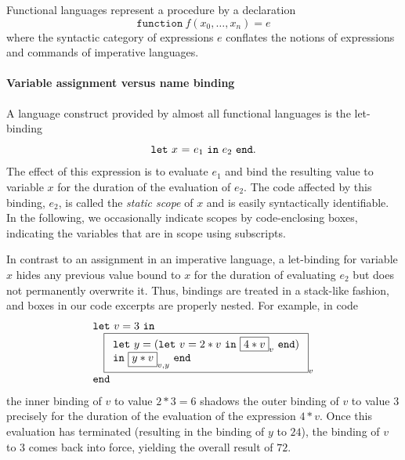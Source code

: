 Functional languages represent a procedure by a declaration
$$\mathtt{function}\ f(x_0, \ldots, x_n) = e$$ where the syntactic
category of expressions $e$ conflates the notions of expressions and
commands of imperative languages.

\paragraph{Variable assignment versus name binding}
A language construct provided by almost all functional languages is
the let-binding $$\mathtt{let}\ {x}\ \mathtt{=}\ {e_1}\ \mathtt{in}\ {e_2}\ \mathtt{end}.$$ The effect of this
expression is to evaluate $e_1$ and bind the resulting value to
variable $x$ for the duration of the evaluation of $e_2$.  The code
affected by this binding, $e_2$, is called the \emph{static scope} of
$x$ and is easily syntactically identifiable.  In the following, we
occasionally indicate scopes by code-enclosing boxes, indicating the
variables that are in scope using subscripts.

In contrast to an assignment in an imperative language, a let-binding
for variable $x$ hides any previous value bound to $x$ for the
duration of evaluating $e_2$ but does not permanently overwrite
it. Thus, bindings are treated in a stack-like fashion, and boxes in
our code excerpts are properly nested.
For example, in code 
\begin{equation}
\label{FunctionalCodeExample1}
\begin{array}{l}
\mathtt{let}\ v = 3\ \mathtt{in}\\
\quad 
  \fbox{$
   \begin{array}[t]{l} 
    \mathtt{let}\ y = (\mathtt{let}\ v=2*v \ \mathtt{in}\ \fbox{$4*v$}_v\ \mathtt{end})\\
    \mathtt{in}\ \fbox{$y*v$}_{v,y}\ \mathtt{end}\\
\end{array}$}_v\\
\mathtt{end}
\end{array}
\end{equation}
the inner binding of $v$ to value $2*3=6$ shadows the outer binding of
$v$ to value $3$ precisely for the duration of the evaluation of the
expression $4*v$. Once this evaluation has terminated (resulting in
the binding of $y$ to $24$), the binding of $v$ to $3$ comes back into
force, yielding the overall result of $72$.


